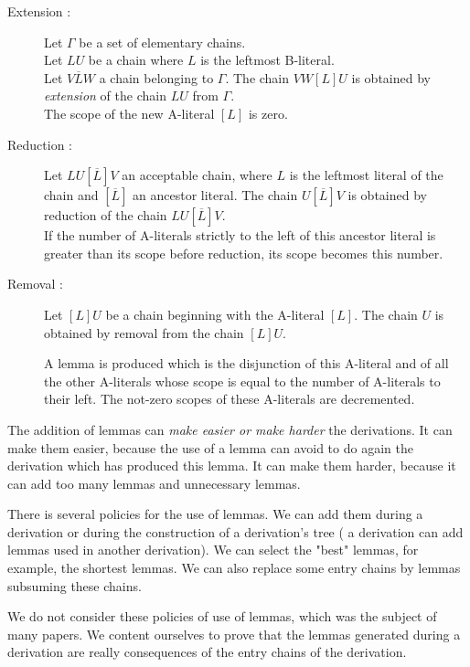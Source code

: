 \documentclass{article}
\begin{document}
\begin{description}
\item [Extension :]
Let $\Gamma$ be a set of elementary chains. \\
Let $L U$ be a chain   where $L$ is the leftmost B-literal. \\
Let $V \overline{L} W$ a chain belonging to $\Gamma$. The chain  $VW[L]U$ 
is obtained by \emph{extension} of the chain $LU$ from $\Gamma$.\\
The scope of the new A-literal $[L]$ is zero.

\item [Reduction :]
Let $L U [\overline{L}] V$  an acceptable chain, where $L$ is the leftmost literal of the chain and 
 $[\overline{L}]$ an ancestor literal. The chain 
 $U [\overline{L}]V$  is obtained by reduction of the chain $L U [\overline{L}]V$.\\
If the number of A-literals strictly to the left of this ancestor literal is greater than its scope before reduction, its scope
becomes this number.

\item [Removal :] 
Let  $[L]U$ be a chain beginning with the A-literal $[L]$. The chain $U$ is obtained by removal from the chain
 $[L]U$.

A lemma is produced which is the disjunction of this A-literal and of all the other A-literals 
whose scope is equal to the number
of A-literals to their left. The not-zero scopes of these A-literals are decremented.
\end{description}


The addition of lemmas can \emph{make easier or make harder} the derivations. It can make them easier, because the use of a lemma
can avoid to do again the derivation which has produced this lemma. 
It can make them harder, because it can add too many lemmas and unnecessary lemmas.

There is several policies for the use of lemmas. We can add them during a derivation or during the 
construction of a derivation's tree ( a derivation can add lemmas used in another derivation). 
We can select the "best" lemmas, for example, the shortest lemmas. We can also replace some entry chains by lemmas subsuming these
chains.

We do not consider these policies of use of lemmas, which was the subject of many papers. We content ourselves to prove
that the lemmas generated during a derivation are really consequences of the entry chains of the derivation.
\end{document}
